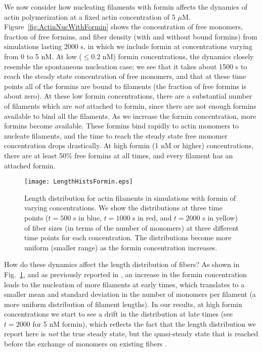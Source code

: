 \documentclass[11pt]{article}
\begin{document}
We now consider how nucleating filaments with formin affects the dynamics of actin polymerization at a fixed actin concentration of 5 $\mu$M. Figure\ \ref{fig:ActinNucWithFormin} shows the concentration of free monomers, fraction of free formins, and fiber density (with and without bound formins) from simulations lasting 2000 s, in which we include formin at concentrations varying from 0 to 5 nM. At low ($\leq 0.2$ nM) formin concentrations, the dynamics closely resemble the spontaneous nucleation case; we see that it takes about 1500 s to reach the steady state concentration of free monomers, and that at these time points all of the formins are bound to filaments (the fraction of free formins is about zero). At these low formin concentrations, there are a substantial number of filaments which are \emph{not} attached to formin, since there are not enough formins available to bind all the filaments. As we increase the formin concentration, more formins become available. These formins bind rapidly to actin monomers to nucleate filaments, and the time to reach the steady state free monomer concentration drops drastically. At high formin (1 nM or higher) concentrations, there are at least 50\% free formins at all times, and every filament has an attached formin. 

\begin{figure}
\centering
\texttt{[image: LengthHistsFormin.eps]}
\caption{\label{fig:HistsWithFormin}Length distribution for actin filaments in simulations with formin of varying concentrations. We show the distributions at three time points ($t=500$ s in blue, $t=1000$ s in red, and $t=2000$ s in yellow) of fiber sizes (in terms of the number of monomers) at three different time points for each concentration. The distributions become more uniform (smaller range) as the formin concentration increases.}
\end{figure}

How do these dynamics affect the length distribution of fibers? As shown in Fig.\ \ref{fig:HistsWithFormin}, and as previously reported in \cite{banerjee2022emergence}, an increase in the formin concentration leads to the nucleation of more filaments at early times, which translates to a smaller mean and standard deviation in the number of monomers per filament (a more uniform distribution of filament lengths). In our results, at high formin concentrations we start to see a drift in the distribution at late times (see $t=2000$ for 5 nM formin), which reflects the fact that the length distribution we report here is \emph{not} the true steady state, but the quasi-steady state that is reached before the exchange of monomers on existing fibers \cite{mohapatra2017limiting}.
\end{document}
